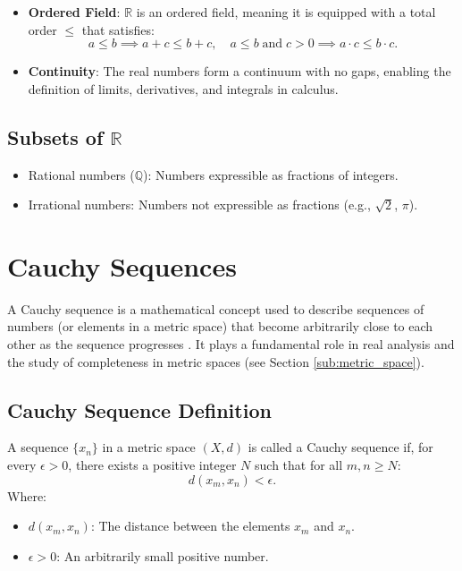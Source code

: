 \begin{itemize}
\vspace{\baselineskip}\par
    \item \textbf{Ordered Field}: \( \mathbb{R} \) is an ordered field, meaning it is equipped with a total order \( \leq \) that satisfies:
    \[
    a \leq b \implies a + c \leq b + c, \quad a \leq b \; \text{and} \; c > 0 \implies a \cdot c \leq b \cdot c.
    \]

    \item \textbf{Continuity}: The real numbers form a continuum with no gaps, enabling the definition of limits, derivatives, and integrals in calculus.
\end{itemize}

\subsection{Subsets of $\mathbb{R}$} 
    \begin{itemize}
        \item Rational numbers (\( \mathbb{Q} \)): Numbers expressible as fractions of integers.
        \item Irrational numbers: Numbers not expressible as fractions (e.g., \( \sqrt{2} \), \( \pi \)).
    \end{itemize}
    
\section{Cauchy Sequences} \label{sub:cauchy}
A Cauchy sequence is a mathematical concept used to describe sequences of numbers (or elements in a metric space) that become arbitrarily close to each other as the sequence progresses \cite{rudin1976}. It plays a fundamental role in real analysis and the study of completeness in metric spaces (see Section \ref{sub:metric_space}).

\subsection{Cauchy Sequence Definition}
A sequence \( \{x_n\} \) in a metric space \( (X, d) \) is called a Cauchy sequence if, for every \( \epsilon > 0 \), there exists a positive integer \( N \) such that for all \( m, n \geq N \):
\[
d(x_m, x_n) < \epsilon.
\]
Where:
\begin{itemize}
    \item \( d(x_m, x_n) \): The distance between the elements \( x_m \) and \( x_n \).
    \item \( \epsilon > 0 \): An arbitrarily small positive number.
\end{itemize}

